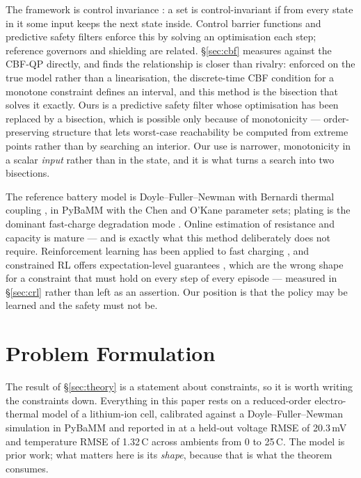 \documentclass[11pt,letterpaper]{article}
\theoremstyle{definition}
\theoremstyle{remark}
\newcommand{\SI}[2]{#1\,#2}
\newcommand{\degreeCelsius}{\degC}
\newcommand{\degC}{\ifmmode{^\circ}\mathrm{C}\else\textdegree C\fi}
\begin{document}
The framework is control invariance \cite{blanchini2008settheoretic}: a set is
control-invariant if from every state in it some input keeps the next state inside. Control
barrier functions \cite{ames2019cbf} and predictive safety filters \cite{wabersich2021psf}
enforce this by solving an optimisation each step; reference governors
\cite{gilbert2002governor} and shielding \cite{alshiekh2018shielding} are related.
\S\ref{sec:cbf} measures against the CBF-QP directly, and finds the relationship is closer than
rivalry: enforced on the true model rather than a linearisation, the discrete-time CBF condition
for a monotone constraint defines an interval, and this method is the bisection that solves it
exactly. Ours is a
predictive safety filter whose optimisation has been replaced by a bisection, which is possible
only because of monotonicity \cite{angeli2003monotone,coogan2015mixed} --- order-preserving
structure that lets worst-case reachability be computed from extreme points rather than by
searching an interior. Our use is narrower, monotonicity in a scalar \emph{input} rather than in
the state, and it is what turns a search into two bisections.

The reference battery model is Doyle--Fuller--Newman \cite{doyle1993,newman2004} with Bernardi
thermal coupling \cite{bernardi1985}, in PyBaMM \cite{sulzer2021pybamm} with the Chen
\cite{chen2020} and O'Kane \cite{okane2022} parameter sets; plating is the dominant fast-charge
degradation mode \cite{yang2017plating}. Online estimation of resistance and capacity is mature
\cite{plett2015,moura2017} --- and is exactly what this method deliberately does not require.
Reinforcement learning has been applied to fast charging \cite{wei2022ddpg,attia2020}, and
constrained RL offers expectation-level guarantees \cite{achiam2017cpo,altman1999constrained},
which are the wrong shape for a constraint that must hold on every step of every episode ---
measured in \S\ref{sec:crl} rather than left as an assertion. Our
position is that the policy may be learned and the safety must not be.

\section{Problem Formulation}\label{sec:cell}

The result of \S\ref{sec:theory} is a statement about constraints, so it is worth writing the
constraints down. Everything in this paper rests on a reduced-order electro-thermal model of a
lithium-ion cell, calibrated against a Doyle--Fuller--Newman simulation in PyBaMM and reported
in \cite{krishnan2026safe} at a held-out voltage RMSE of 20.3\,mV and temperature RMSE of
\SI{1.32}{\degreeCelsius} across ambients from 0 to \SI{25}{\degreeCelsius}. The model is prior work; what matters here
is its \emph{shape}, because that is what the theorem consumes.
\end{document}
